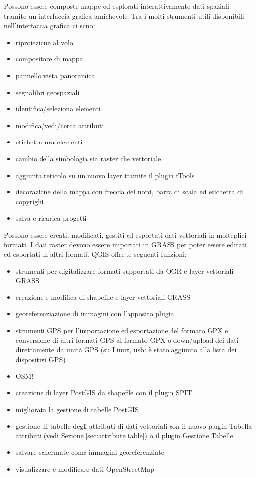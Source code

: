 Possono essere composte mappe ed esplorati interattivamente dati spaziali
tramite un interfaccia grafica amichevole. Tra i molti strumenti utili disponibili
nell'interfaccia grafica ci sono:
\begin{itemize}
\item riproiezione al volo
\item compositore di mappa
\item pannello vista panoramica 
\item segnalibri geospaziali 
\item identifica/seleziona elementi
\item modifica/vedi/cerca attributi
\item etichettatura elementi
\item cambio della simbologia sia raster che vettoriale
\item aggiunta reticolo su un nuovo layer tramite il plugin fTools
\item decorazione della mappa con freccia del nord, barra di scala ed etichetta di copyright
\item salva e ricarica progetti
\end{itemize}


Possono essere creati, modificati, gestiti ed esportati dati vettoriali
in molteplici formati. I dati raster devono essere importati in GRASS
per poter essere editati ed esportati in altri formati. QGIS offre
le seguenti funzioni:
\begin{itemize}
\item strumenti per digitalizzare formati supportati da OGR e layer vettoriali GRASS
\item creazione e modifica di shapefile e layer vettoriali GRASS 
\item georeferenziazione di immagini con l'apposito plugin 
\item strumenti GPS per l'importazione ed esportazione del formato GPX e conversione di altri formati GPS
al formato GPX o down/upload dei dati direttamente da unità GPS (su Linux, usb: è stato aggiunto 
alla lista dei dispositivi GPS)
\item OSM!
\item creazione di layer PostGIS da shapefile con il plugin SPIT
\item migliorata la gestione di tabelle PostGIS
\item gestione di tabelle degli attributi di dati vettoriali con il nuovo plugin Tabella attributi (vedi Sezione 
\ref{sec:attribute table}) o il plugin Gestione Tabelle
\item salvare schermate come immagini georeferenziate
\item visualizzare e modificare dati OpenStreetMap
\end{itemize}

